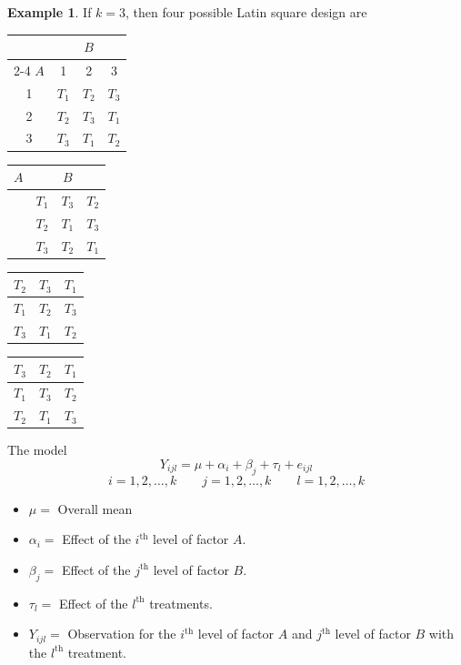 \documentclass[11pt,a4paper]{article}
\theoremstyle{definition}
\newtheorem{exa}[thm]{Example}
\begin{document}
\begin{exa}
If $k=3$, then four possible Latin square design are 

\begin{table}[H]
\begin{tabular}{|c|c|c|c|}
\hline
    & \multicolumn{3}{c|}{$B$}\\
    \cline{2-4}
$A$ & 1 & 2 & 3\\
\hline
1 & $T_1$ & $T_2$ & $T_3$\\
\hline
2 & $T_2$ & $T_3$ & $T_1$\\
\hline
3 & $T_3$ & $T_1$ & $T_2$\\
\hline
\end{tabular}
\qquad 
\begin{tabular}{c|c|c|c|}
$A$ & & $B$ & \\
\hline
    & $T_1$ & $T_3$ & $T_2$\\
    & $T_2$ & $T_1$ & $T_3$\\
    & $T_3$ & $T_2$ & $T_1$\\
\hline
\end{tabular}
\qquad 
\begin{tabular}{|c|c|c|}
\hline
$T_2$ & $T_3$ & $T_1$\\
\hline
$T_1$ & $T_2$ & $T_3$\\
\hline
$T_3$ & $T_1$ & $T_2$\\
\hline
\end{tabular}
\qquad 
\begin{tabular}{|c|c|c|}
\hline
$T_3$ & $T_2$ & $T_1$\\
\hline
$T_1$ & $T_3$ & $T_2$\\
\hline
$T_2$ & $T_1$ & $T_3$\\
\hline
\end{tabular}
\end{table}

The model $$Y_{ijl} = \mu + \alpha_i +\beta_j + \tau_l +e_{ijl}$$
$$i=1,2,\ldots ,k\qquad  j=1,2,\ldots ,k\qquad  l=1,2,\ldots ,k$$

\begin{itemize}
\item[] $\mu = $ Overall mean
\item[] $\alpha_i=$ Effect of the $i^{\text{th}}$ level of factor $A$.
\item[] $\beta_j = $ Effect of the $j^{\text{th}}$ level of factor $B$.
\item[] $\tau_l=$ Effect of the $l^{\text{th}}$ treatments.
\item[] $Y_{ijl} = $ Observation for the $i^{\text{th}}$ level of factor $A$ and $j^{\text{th}}$ level of factor $B$ with the $l^{\text{th}}$ treatment.
\end{itemize}


\end{exa}
\end{document}
